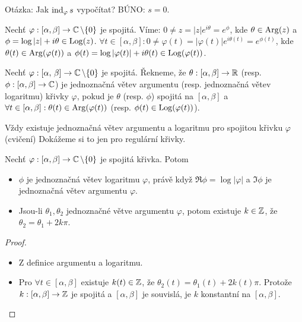 \begin{note}
Otázka: Jak $\operatorname{ind}_\varphi s$ vypočítat? BÚNO: $s=0$.
\end{note}

\begin{notation}
Nechť $\varphi: [\alpha, \beta] \rightarrow \operatorname{\mathbb{C}}  \setminus \{0\}$ je spojitá. Víme: $0 \neq z = |z|e^{i \theta}=e^{\phi}$, kde $\theta \in \operatorname*{Arg}(z)$ a $\phi = \log|z| + i \theta \in \operatorname*{Log}(z)$. $\forall t \in [\alpha, \beta]: 0 \neq \varphi(t)=|\varphi(t)|e^{i \theta(t)}=e^{ \phi(t)}$, kde $\theta(t) \in \operatorname*{Arg}(\varphi(t))$ a $\phi(t)=\log|\varphi(t)|+i \theta(t) \in \operatorname*{Log}(\varphi(t))$.
\end{notation}

\begin{definition}
Nechť $\varphi: [\alpha,\,\beta] \rightarrow \operatorname{\mathbb{C}}  \setminus \{0\}$ je spojitá. Řekneme, že $\theta: [\alpha, \beta] \rightarrow \operatorname{\mathbb{R}}$ (resp. $\phi: [\alpha, \beta] \rightarrow \operatorname{\mathbb{C}} $) je jednoznačná větev argumentu (resp. jednoznačná větev logaritmu) křivky $\varphi$, pokud je $\theta$ (resp. $\phi$) spojitá na $[\alpha, \beta]$ a $\forall t \in [\alpha, \beta]:  \theta(t) \in \operatorname*{Arg}(\varphi(t))$ (resp. $\phi(t) \in \operatorname*{Log}(\varphi(t))$).
\end{definition}

\begin{note}
Vždy existuje jednoznačná větev argumentu a logaritmu pro spojitou křivku $\varphi$ (cvičení) Dokážeme si to jen pro regulární křivky.
\end{note}

\begin{theorem}
Nechť $\varphi: [\alpha, \beta] \rightarrow \operatorname{\mathbb{C}}  \setminus \{0\}$ je spojitá křivka. Potom
\begin{itemize}
    \item $\phi$ je jednoznačná větev logaritmu $\varphi$, právě když $\Re \phi = \log|\varphi|$ a $\Im \phi$ je jednoznačná větev argumentu $\varphi$.
    \item Jsou-li $\theta_1, \theta_2$ jednoznačné větve argumentu $\varphi$, potom existuje $k \in \operatorname{\mathbb{Z}}$, že $\theta_2=\theta_1 + 2 k \pi $.
\end{itemize}
\end{theorem}

\begin{proof}
\begin{itemize}
    \item Z definice argumentu a logaritmu.
    \item Pro $\forall t \in [\alpha, \beta]$ existuje $k (t) \in \operatorname{\mathbb{Z}}$, že $\theta_2(t)=\theta_1(t) + 2 k(t) \pi$. Protože $k:  [\alpha, \beta] \rightarrow \operatorname{\mathbb{Z}}$ je spojitá a $[\alpha, \beta]$ je souvislá, je $k$ konstantní na $[\alpha, \beta]$.
\end{itemize}
\end{proof}

